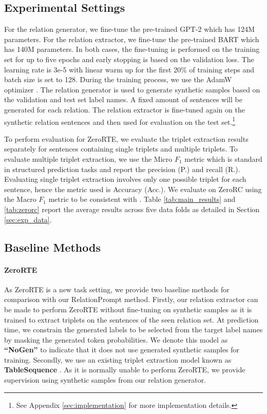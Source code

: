 \documentclass[11pt]{article}
\begin{document}
 
\subsection{Experimental Settings}
For the relation generator, we fine-tune the pre-trained GPT-2 \cite{radford2019language} which has 124M parameters. 
For the relation extractor, we fine-tune the pre-trained BART \cite{lewis2020bart} which has 140M parameters.
In both cases, the fine-tuning is performed on the training set for up to five epochs and early stopping is based on the validation loss. 
The learning rate is 3e-5 with linear warm up for the first 20\% of training steps and batch size is set to 128.
During the training process, we use the AdamW optimizer \cite{loshchilov2018decoupled}.
The relation generator is used to generate synthetic samples based on the validation and test set label names. 
A fixed amount of sentences will be generated for each relation.
The relation extractor is fine-tuned again on the synthetic relation sentences and then used for evaluation on the test set.\footnote{See Appendix \ref{sec:implementation} for more implementation details.}

To perform evaluation for ZeroRTE, we evaluate the triplet extraction results separately for sentences containing single triplets and multiple triplets.
To evaluate multiple triplet extraction, we use the Micro $F_{1}$ metric which is standard in structured prediction tasks \cite{paolini2020structured} and report the precision (P.) and recall (R.).
Evaluating single triplet extraction involves only one possible triplet for each sentence, hence the metric used is Accuracy (Acc.).
We evaluate on ZeroRC using the Macro $F_{1}$ metric to be consistent with \citet{chen2021zs}.
Table \ref{tab:main_results} and \ref{tab:zerorc} report the average results across five data folds as detailed in Section \ref{sec:exp_data}.



\subsection{Baseline Methods}
\paragraph{ZeroRTE}
As ZeroRTE is a new task setting, we provide two baseline methods for comparison with our RelationPrompt method. 
Firstly, our relation extractor can be made to perform ZeroRTE without fine-tuning on synthetic samples as it is trained to extract triplets
on the sentences of the seen relation set.
At prediction time, we constrain the generated labels to be selected from the target label names by masking the generated token probabilities. 
We denote this model as 
\textbf{``NoGen''} 
to indicate that it does not use generated synthetic samples for training.
Secondly, we use an existing triplet extraction model known as \textbf{TableSequence} \cite{wang2020two}. 
As it is normally unable to perform ZeroRTE, we provide supervision using synthetic samples from our relation generator.
\end{document}
